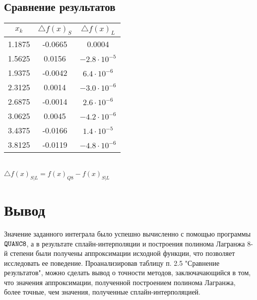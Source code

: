 \documentclass[a4paper,11pt]{article}
\begin{document}
\subsection{Сравнение результатов}
\begin{tabular}{ | c | c | c |}
  \hline
  \footnotesize
  $x_k$ & $\triangle f(x)_S$ & $\triangle f(x)_L$ \\ \hline
  1.1875 & -0.0665 & 0.0004 \\ \hline
  1.5625 & 0.0156 & $-2.8\cdot10^{-5}$ \\ \hline
  1.9375 & -0.0042 & $6.4\cdot10^{-6}$ \\ \hline
  2.3125 & 0.0014 & $-3.0\cdot10^{-6}$ \\ \hline
  2.6875 & -0.0014 & $2.6\cdot10^{-6}$ \\ \hline
  3.0625 & 0.0045 & $-4.2\cdot10^{-6}$ \\ \hline
  3.4375 & -0.0166 & $1.4\cdot10^{-5}$ \\ \hline
  3.8125 & -0.0119 & $-4.8\cdot10^{-6}$ \\ \hline
\end{tabular} \\

\noindent $\triangle f(x)_{S|L} = f(x)_{Q8} - f(x)_{S|L}$

\vspace{5mm}
\section{Вывод}
\noindent Значение заданного интеграла было успешно вычисленно с помощью программы $\verb|QUANC8|$,
      а в результате сплайн-интерполяции и построения полинома Лагранжа 8-й степени были получены аппроксимации
      исходной функции, что позволяет исследовать ее поведение. Проанализировав таблицу п. 2.5 "Сравнение результатов",
      можно сделать вывод о точности методов, заключачающийся в том, что значения аппроксимации, полученной построением
      полинома Лагранжа, более точные, чем значения, полученные сплайн-интерполяцией.
\end{document}
